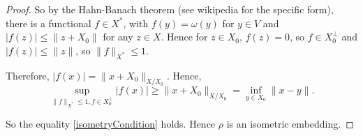 \documentclass{unswmaths}
\begin{document}
\begin{proof}
    So by the Hahn-Banach theorem (see wikipedia for the specific form), there is a functional $f \in X^*$, with $f(y) = \omega(y)$ for $y \in V$
    and $|f(z)| \leq \|z+X_0\|$ for any $z \in X$. Hence for $z \in X_0$, $f(z) = 0$, so $f \in X_0^\perp$
    and $|f(z)|\leq \|z\|$, so $\|f\|_{X^*}\leq 1$. 
    
    
    
    Therefore, $|f(x)| = \|x+X_0\|_{X/X_0}$. Hence, 
    \begin{equation*}
        \sup_{\|f\|_{X^*} \leq 1, f \in X_0^\perp} |f(x)| \geq \|x+X_0\|_{X/X_0} =  \inf_{y \in X_0} \|x-y\|.
    \end{equation*}
    
    So the equality \ref{isometryCondition} holds. Hence $\rho$ is an isometric embedding.    
\end{proof}

    
\end{document}
